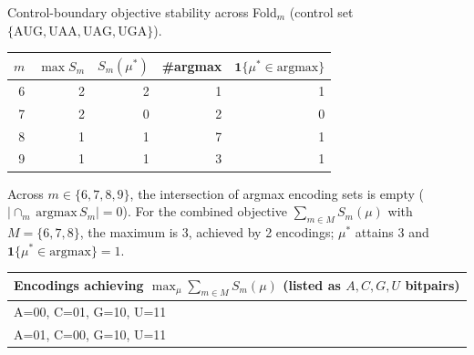 Control-boundary objective stability across Fold$_m$ (control set $\{\mathrm{AUG,UAA,UAG,UGA}\}$).

\begin{center}
\small
\setlength{\tabcolsep}{6pt}
\renewcommand{\arraystretch}{1.15}
\begin{tabular}{r r r r r}
\toprule
$m$ & $\max S_m$ & $S_m(\mu^\ast)$ & \#argmax & $\mathbf{1}\{\mu^\ast\in\mathrm{argmax}\}$ \\
\midrule
6 & 2 & 2 & 1 & 1 \\
7 & 2 & 0 & 2 & 0 \\
8 & 1 & 1 & 7 & 1 \\
9 & 1 & 1 & 3 & 1 \\
\bottomrule
\end{tabular}
\end{center}

Across $m\in\{6,7,8,9\}$, the intersection of argmax encoding sets is empty ($|\cap_m\,\mathrm{argmax}\,S_m|=0$).
For the combined objective $\sum_{m\in M} S_m(\mu)$ with $M=\{6,7,8\}$, the maximum is 3, achieved by 2 encodings; $\mu^\ast$ attains 3 and $\mathbf{1}\{\mu^\ast\in\mathrm{argmax}\}=1$.

\begin{center}
\small
\begin{tabular}{l}
\toprule
Encodings achieving $\max_\mu\sum_{m\in M} S_m(\mu)$ (listed as $A,C,G,U$ bitpairs) \\
\midrule
A=00, C=01, G=10, U=11 \\
A=01, C=00, G=10, U=11 \\
\bottomrule
\end{tabular}
\end{center}

